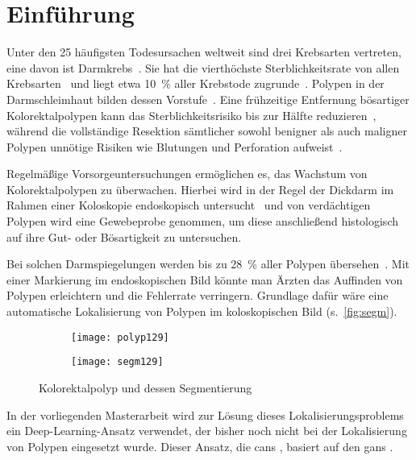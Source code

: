 \chapter{Einführung}

Unter den 25 häufigsten Todesursachen weltweit sind drei Krebsarten vertreten, eine davon ist Darmkrebs~\cite{Lozano.2012}.
Sie hat die vierthöchste Sterblichkeitsrate von allen Krebsarten~\cite{Ferlay.2012} und liegt etwa 10~\% aller Krebstode zugrunde~\cite{Kumar.2005}.
Polypen in der Darmschleimhaut bilden dessen Vorstufe~\cite{Kumar.2005}.
Eine frühzeitige Entfernung bösartiger Kolorektalpolypen kann das Sterblichkeitsrisiko bis zur Hälfte reduzieren~\cite{Zauber.2012}, während die vollständige Resektion sämtlicher sowohl benigner als auch maligner Polypen unnötige Risiken wie Blutungen und Perforation aufweist~\cite{Rex.2009}.

Regelmäßige Vorsorgeuntersuchungen ermöglichen es, das Wachstum von Kolorektalpolypen zu überwachen.
Hierbei wird in der Regel der Dickdarm im Rahmen einer Koloskopie endoskopisch untersucht~\cite{Kumar.2005} und von verdächtigen Polypen wird eine Gewebeprobe genommen, um diese anschließend histologisch auf ihre Gut- oder Bösartigkeit zu untersuchen.

Bei solchen Darmspiegelungen werden bis zu 28~\% aller Polypen übersehen~\cite{Leufkens.2012}.
Mit einer Markierung im endoskopischen Bild könnte man Ärzten das Auffinden von Polypen erleichtern und die Fehlerrate verringern.
Grundlage dafür wäre eine automatische Lokalisierung von Polypen im koloskopischen Bild (s.~\autoref{fig:segm}).

\begin{figure}
	\centering
	\begin{subfigure}{.45\textwidth}
		\centering
		\texttt{[image: polyp129]}
		\caption{}
		\label{fig:polyp}
	\end{subfigure}
	\begin{subfigure}{.45\textwidth}
		\centering
		\texttt{[image: segm129]}
		\caption{}
		\label{fig:segm}
	\end{subfigure}
	\caption[Kolorektalpolyp und dessen Segmentierung]{Kolorektalpolyp und dessen Segmentierung~\cite{Vazquez.2017}}
	\label{fig:polypseg}
\end{figure}

In der vorliegenden Masterarbeit wird zur Lösung dieses Lokalisierungsproblems ein Deep-Learning-Ansatz verwendet, der bisher noch nicht bei der Lokalisierung von Polypen eingesetzt wurde.
Dieser Ansatz, die \glspl{can} \cite{Isola.2017}, basiert auf den \glspl{gan} \cite{Goodfellow.2014}.

